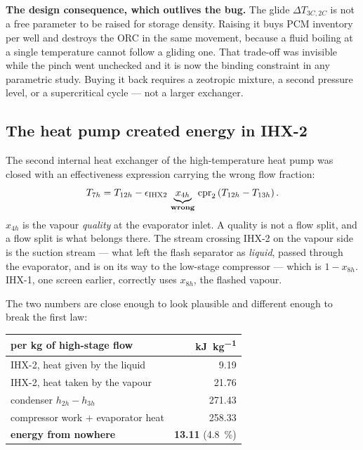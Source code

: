 \medskip
\noindent\textbf{The design consequence, which outlives the bug.} The glide
$\Delta T_{3C,2C}$ is not a free parameter to be raised for storage density.
Raising it buys PCM inventory per well and destroys the ORC in the same
movement, because a fluid boiling at a single temperature cannot follow a
gliding one. That trade-off was invisible while the pinch went unchecked and it
is now the binding constraint in any parametric study. Buying it back requires a
zeotropic mixture, a second pressure level, or a supercritical cycle --- not a
larger exchanger.

\subsection{The heat pump created energy in IHX-2}
\label{sec:defects:ihx2}

The second internal heat exchanger of the high-temperature heat pump was closed
with an effectiveness expression carrying the wrong flow fraction:
\begin{equation}
  T_{7h} = T_{12h} - \epsilon_{\mathrm{IHX2}}\,
           \underbrace{x_{4h}}_{\text{\textbf{wrong}}}\,
           \mathrm{cpr}_{2}\left(T_{12h}-T_{13h}\right).
\end{equation}
$x_{4h}$ is the vapour \emph{quality} at the evaporator inlet. A quality is not
a flow split, and a flow split is what belongs there. The stream crossing IHX-2
on the vapour side is the suction stream --- what left the flash separator as
\emph{liquid}, passed through the evaporator, and is on its way to the low-stage
compressor --- which is $1-x_{8h}$. IHX-1, one screen earlier, correctly uses
$x_{8h}$, the flashed vapour.

The two numbers are close enough to look plausible and different enough to break
the first law:

\begin{center}
\begin{tabular}{@{}l r@{}}
\toprule
per \si{\kilogram} of high-stage flow & \si{\kilo\joule\per\kilogram} \\
\midrule
IHX-2, heat given by the liquid    & 9.19 \\
IHX-2, heat taken by the vapour    & 21.76 \\
\midrule
condenser $h_{2h}-h_{3h}$          & 271.43 \\
compressor work $+$ evaporator heat & 258.33 \\
\textbf{energy from nowhere}       & \textbf{13.11} \;(\SI{4.8}{\percent}) \\
\bottomrule
\end{tabular}
\end{center}

